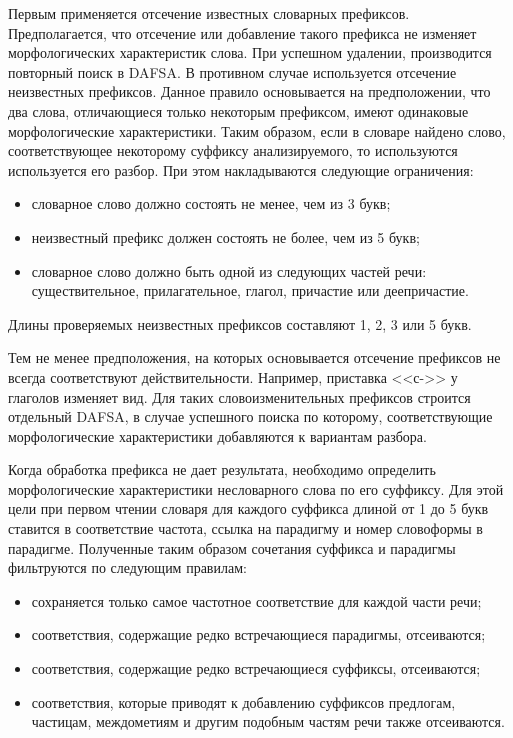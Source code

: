 Первым применяется отсечение известных словарных префиксов. Предполагается, что отсечение или добавление такого префикса не изменяет морфологических характеристик слова. При успешном удалении, производится повторный поиск в DAFSA. В противном случае используется отсечение неизвестных префиксов. Данное правило основывается на предположении, что два слова, отличающиеся только некоторым префиксом, имеют одинаковые морфологические характеристики. Таким образом, если в словаре найдено слово, соответствующее некоторому суффиксу анализируемого, то используются используется его разбор. При этом накладываются следующие ограничения:
\begin{itemize}
	\item словарное слово должно состоять не менее, чем из 3 букв;
	\item неизвестный префикс должен состоять не более, чем из 5 букв;
	\item словарное слово должно быть одной из следующих частей речи: существительное, прилагательное, глагол, причастие или деепричастие.
\end{itemize}
Длины проверяемых неизвестных префиксов составляют 1, 2, 3 или 5 букв.

Тем не менее предположения, на которых основывается отсечение префиксов не всегда соответствуют действительности. Например, приставка <<с->> у глаголов изменяет вид. Для таких словоизменительных префиксов строится отдельный DAFSA, в случае успешного поиска по которому, соответствующие морфологические характеристики добавляются к вариантам разбора.

Когда обработка префикса не дает результата, необходимо определить морфологические характеристики несловарного слова по его суффиксу. Для этой цели при первом чтении словаря для каждого суффикса длиной от 1 до 5 букв ставится в соответствие частота, ссылка на парадигму и номер словоформы в парадигме. Полученные таким образом сочетания суффикса и парадигмы фильтруются по следующим правилам:
\begin{itemize}
	\item сохраняется только самое частотное соответствие для каждой части речи;
	\item соответствия, содержащие редко встречающиеся парадигмы, отсеиваются;
	\item соответствия, содержащие редко встречающиеся суффиксы, отсеиваются;
	\item соответствия, которые приводят к добавлению суффиксов предлогам, частицам, междометиям и другим подобным частям речи также отсеиваются. 
\end{itemize}

